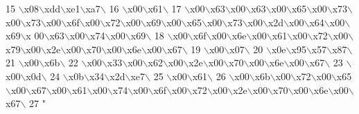 \begin{DoxyCode}
15 \textcolor{stringliteral}{\(\backslash\)x08\(\backslash\)xdd\(\backslash\)xe1\(\backslash\)xa7\(\backslash\)}
16 \textcolor{stringliteral}{\(\backslash\)x00\(\backslash\)x61\(\backslash\)}
17 \textcolor{stringliteral}{\(\backslash\)x00\(\backslash\)x63\(\backslash\)x00\(\backslash\)x63\(\backslash\)x00\(\backslash\)x65\(\backslash\)x00\(\backslash\)x73\(\backslash\)x00\(\backslash\)x73\(\backslash\)x00\(\backslash\)x6f\(\backslash\)x00\(\backslash\)x72\(\backslash\)x00\(\backslash\)x69\(\backslash\)x00\(\backslash\)x65\(\backslash\)x00\(\backslash\)x73\(\backslash\)x00\(\backslash\)x2d\(\backslash\)x00\(\backslash\)x64\(\backslash\)x00\(\backslash\)x69\(\backslash\)x
      00\(\backslash\)x63\(\backslash\)x00\(\backslash\)x74\(\backslash\)x00\(\backslash\)x69\(\backslash\)}
18 \textcolor{stringliteral}{\(\backslash\)x00\(\backslash\)x6f\(\backslash\)x00\(\backslash\)x6e\(\backslash\)x00\(\backslash\)x61\(\backslash\)x00\(\backslash\)x72\(\backslash\)x00\(\backslash\)x79\(\backslash\)x00\(\backslash\)x2e\(\backslash\)x00\(\backslash\)x70\(\backslash\)x00\(\backslash\)x6e\(\backslash\)x00\(\backslash\)x67\(\backslash\)}
19 \textcolor{stringliteral}{\(\backslash\)x00\(\backslash\)x07\(\backslash\)}
20 \textcolor{stringliteral}{\(\backslash\)x0e\(\backslash\)x95\(\backslash\)x57\(\backslash\)x87\(\backslash\)}
21 \textcolor{stringliteral}{\(\backslash\)x00\(\backslash\)x6b\(\backslash\)}
22 \textcolor{stringliteral}{\(\backslash\)x00\(\backslash\)x33\(\backslash\)x00\(\backslash\)x62\(\backslash\)x00\(\backslash\)x2e\(\backslash\)x00\(\backslash\)x70\(\backslash\)x00\(\backslash\)x6e\(\backslash\)x00\(\backslash\)x67\(\backslash\)}
23 \textcolor{stringliteral}{\(\backslash\)x00\(\backslash\)x0d\(\backslash\)}
24 \textcolor{stringliteral}{\(\backslash\)x0b\(\backslash\)x34\(\backslash\)x2d\(\backslash\)xe7\(\backslash\)}
25 \textcolor{stringliteral}{\(\backslash\)x00\(\backslash\)x61\(\backslash\)}
26 \textcolor{stringliteral}{\(\backslash\)x00\(\backslash\)x6b\(\backslash\)x00\(\backslash\)x72\(\backslash\)x00\(\backslash\)x65\(\backslash\)x00\(\backslash\)x67\(\backslash\)x00\(\backslash\)x61\(\backslash\)x00\(\backslash\)x74\(\backslash\)x00\(\backslash\)x6f\(\backslash\)x00\(\backslash\)x72\(\backslash\)x00\(\backslash\)x2e\(\backslash\)x00\(\backslash\)x70\(\backslash\)x00\(\backslash\)x6e\(\backslash\)x00\(\backslash\)x67\(\backslash\)}
27 \textcolor{stringliteral}{"}
\end{DoxyCode}
\hypertarget{namespacestates__rc3_a1a5b3a1aebad83bf86ce0315273ac981}{}
